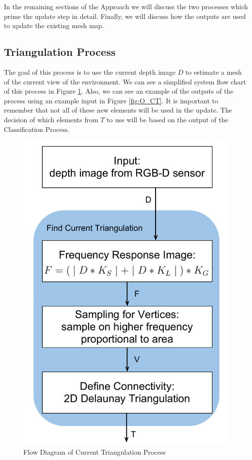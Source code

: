 \documentclass[12pt]{article}
\begin{document}
In the remaining sections of the Approach we will discuss the two
processes which prime the update step in detail. Finally, we will
discuss how the outputs are used to update the existing mesh map.

\subsection{Triangulation Process}

The goal of this process is to use the current depth image $D$ to estimate a
mesh of the current view of the environment. We can see a
simplified system flow chart of this process in Figure \ref{fig:SD_CT}.
Also, we can see an example of the outputs of the process using an
example input in Figure \ref{fig:O_CT}. It is important to
remember that not all of these new elements will be used in the update.
The decision of which elements from $T$ to use will be based on the
output of the Classification Process. 

\begin{figure}[h!]
  \centering
    \includegraphics[height=0.4\textwidth]{SD_CT.pdf}
  \caption{Flow Diagram of Current Triangulation Process}
  \label{fig:SD_CT}
\end{figure}
\end{document}
